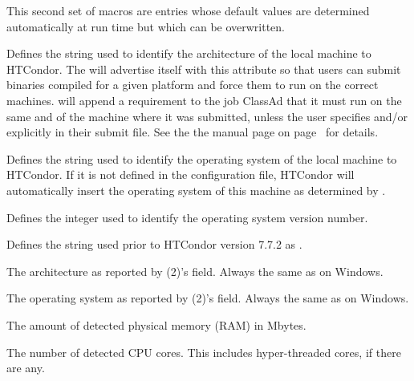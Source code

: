 This second set of macros are entries whose default values are
determined automatically at run time but which can be overwritten.  
\begin{description}

\label{param:Arch}
\item[\MacroU{ARCH}]
  Defines the string
  used to identify the architecture of the local machine to HTCondor.
  The  will advertise itself with this attribute so
  that users can submit binaries compiled for a given platform and
  force them to run on the correct machines.   will
  append a requirement to the job ClassAd that it must
  run on the same  and  of the machine where
  it was submitted, unless the user specifies  and/or
   explicitly in their submit file.  See the
  the  manual page
  on page~\pageref{man-condor-submit} for details.

\label{param:OpSys}
\item[\MacroU{OPSYS}]
  Defines the string used to identify the operating system
  of the local machine to HTCondor.
  If it is not defined in the configuration file, HTCondor will
  automatically insert the operating system of this machine as
  determined by .

\label{param:OpSysVer}
\item[\MacroU{OPSYS\_VER}]
  Defines the integer used to identify the operating system version number.

\label{param:OpSysAndVer}
\item[\MacroU{OPSYS\_AND\_VER}]
  Defines the string used prior to HTCondor version 7.7.2 as .

\label{param:UnameArch}
\item[\MacroU{UNAME\_ARCH}]
  The architecture as reported by (2)'s  field.
  Always the same as  on Windows.

\label{param:UnameOpsys}
\item[\MacroU{UNAME\_OPSYS}]
  The operating system as reported by (2)'s  field.
  Always the same as  on Windows.

\label{param:DetectedMemory}
\item[\MacroU{DETECTED\_MEMORY}]
  The amount of detected physical memory (RAM) in Mbytes.

\label{param:DetectedCores}
\item[\MacroU{DETECTED\_CORES}]
  The number of detected CPU cores.  
  This includes hyper-threaded cores, if there are any.


\end{description}
